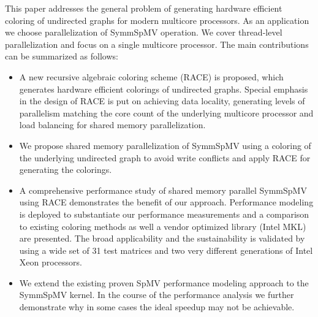 

This paper addresses the general problem of generating hardware efficient \DK coloring
 of undirected graphs for modern multicore processors. As an application we 
 choose parallelization of \acrshort{SymmSpMV} operation. We cover thread-level 
 parallelization and focus on a single multicore processor. The main contributions
  can be summarized as follows: 
\begin{itemize}
\item A new recursive algebraic coloring scheme (RACE) is proposed, 
which generates hardware efficient \DK colorings of undirected graphs. 
Special emphasis in the design of RACE is put on achieving data locality, 
generating levels of parallelism matching the core count of the underlying 
multicore processor and load balancing for shared memory parallelization.
\item We propose shared memory parallelization of \acrshort{SymmSpMV}  
using a \DTWO coloring of the underlying undirected graph to avoid
 write conflicts and apply RACE for generating the colorings.
\item A comprehensive performance study of shared memory parallel \acrshort{SymmSpMV} 
using RACE demonstrates the benefit of our approach. Performance modeling
 is deployed to substantiate our performance measurements and a comparison to
  existing coloring methods as well a vendor optimized library (Intel MKL) 
  are presented. The broad applicability and the sustainability is validated 
  by using a wide set of 31 test matrices and two very different generations 
  of Intel Xeon processors.
\item We extend the existing proven \acrshort{SpMV} performance modeling approach
 to the \acrshort{SymmSpMV} kernel. 
In the course of the 
 performance analysis we further demonstrate why in some cases the ideal speedup
 may not be achievable.

\end{itemize}
